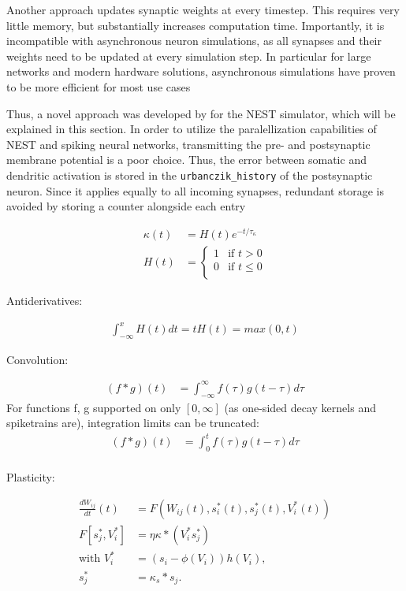 Another approach updates synaptic weights at every timestep. This requires very little memory, but substantially increases
computation time. Importantly, it is incompatible with asynchronous neuron simulations, as all synapses and their weights
need to be updated at every simulation step. In particular for large networks and modern hardware solutions, asynchronous
simulations have proven to be more efficient for most use cases 

Thus, a novel approach was developed by \cite{Stapmanns2021} for the NEST simulator, which will be explained in this
section. In order to utilize the paralellization capabilities of NEST and spiking neural networks, transmitting 
the pre- and postsynaptic membrane potential is a poor choice. Thus, the error between somatic and dendritic activation
is stored in the \texttt{urbanczik\_history} of the postsynaptic neuron. Since it applies equally to all incoming synapses, redundant storage is avoided
by storing a counter alongside each entry 



\begin{align}
  \kappa(t) & = H(t)e^{-t/\tau_{\kappa}} \\
  H(t)      & =
  \begin{cases}
    1 & \text{if $t > 0$}    \\
    0 & \text{if $t \leq 0$} \\
  \end{cases}
\end{align}

Antiderivatives:

\begin{align}
  \int_{-\infty}^x H(t)dt = tH(t) = max(0,t)
\end{align}

Convolution:

\begin{align}
  (f \ast g)(t) & = \int_{- \infty }^{\infty} f(\tau) g(t-\tau) d \tau
\end{align}
For functions f, g supported on only $[0, \infty]$ (as one-sided decay kernels and spiketrains are), integration limits can be truncated:
\begin{align}
  (f \ast g)(t) & = \int_{0}^{t} f(\tau) g(t-\tau) d \tau \\
\end{align}


Plasticity:

\begin{align}
  \frac{dW_{ij}}{dt}(t) & = F(W_{ij}(t), s_i^\ast (t), s_j^\ast (t), V_i^\ast (t)) \\
  F[s_j^\ast, V_i^\ast] & = \eta \kappa \ast (V_i^\ast s_j^\ast)                   \\
  \text{with } V_i^\ast & = (s_i - \phi(V_i )) h(V_i),                             \\
  s_j^\ast              & = \kappa_s \ast s_j.
\end{align}

